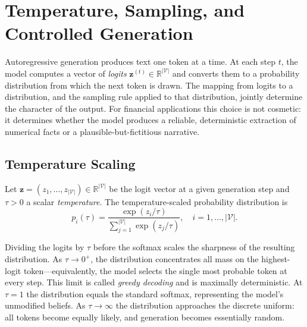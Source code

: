 \section{Temperature, Sampling, and Controlled Generation}
\label{sec:sampling}

\begin{deepdive}

Autoregressive generation produces text one token at a time.  At each step $t$,
the model computes a vector of \emph{logits}
$\mathbf{z}^{(t)} \in \mathbb{R}^{|\mathcal{V}|}$ and converts them to a
probability distribution from which the next token is drawn.  The mapping from
logits to a distribution, and the sampling rule applied to that distribution,
jointly determine the character of the output.  For financial applications this
choice is not cosmetic: it determines whether the model produces a reliable,
deterministic extraction of numerical facts or a plausible-but-fictitious
narrative.

\subsection{Temperature Scaling}
\label{sec:sampling-temperature}

\begin{definition}
\label{def:temperature}
Let $\mathbf{z} = (z_1,\ldots,z_{|\mathcal{V}|}) \in \mathbb{R}^{|\mathcal{V}|}$
be the logit vector at a given generation step and $\tau > 0$ a scalar
\emph{temperature}.  The temperature-scaled probability distribution is
\begin{equation}
  p_i(\tau) = \frac{\exp(z_i / \tau)}{\sum_{j=1}^{|\mathcal{V}|} \exp(z_j / \tau)},
  \quad i = 1,\ldots,|\mathcal{V}|.
  \label{eq:temperature-softmax}
\end{equation}
\end{definition}

Dividing the logits by $\tau$ before the softmax scales the sharpness of the
resulting distribution.  As $\tau \to 0^+$, the distribution concentrates all
mass on the highest-logit token---equivalently, the model selects the single most
probable token at every step.  This limit is called \emph{greedy decoding} and
is maximally deterministic.  At $\tau = 1$ the distribution equals the standard
softmax, representing the model's unmodified beliefs.  As $\tau \to \infty$ the
distribution approaches the discrete uniform: all tokens become equally likely,
and generation becomes essentially random.


\end{deepdive}
